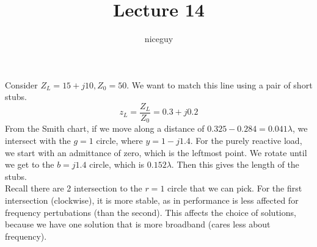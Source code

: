 \documentclass[12pt]{article}
\title{Lecture 14}
\author{niceguy}
\begin{document}
\maketitle

\begin{ex}
    Consider $Z_L = 15 + j10, Z_0 = 50$. We want to match this line using a pair of short stubs. \\
    $$z_L = \frac{Z_L}{Z_0} = 0.3 + j0.2$$
    From the Smith chart, if we move along a distance of $0.325 - 0.284 = 0.041\lambda$, we intersect with the $g=1$ circle, where $y = 1 - j1.4$. For the purely reactive load, we start with an admittance of zero, which is the leftmost point. We rotate until we get to the $b = j1.4$ circle, which is $0.152\lambda$. Then this gives the length of the stubs. \\
    Recall there are 2 intersection to the $r = 1$ circle that we can pick. For the first intersection (clockwise), it is more stable, as in performance is less affected for frequency pertubations (than the second). This affects the choice of solutions, because we have one solution that is more broadband (cares less about frequency).
\end{ex}
\end{document}
